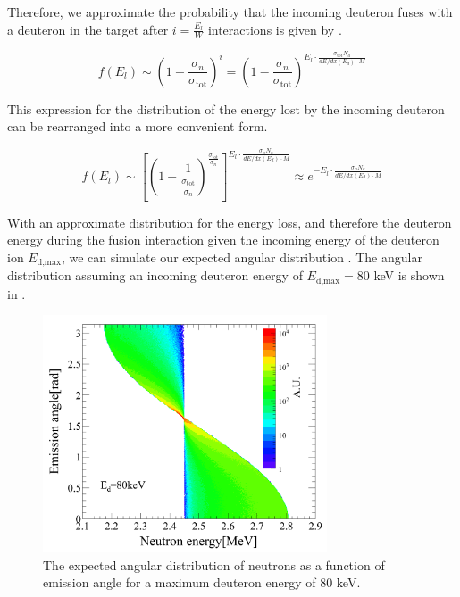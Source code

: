 Therefore, we approximate the probability that the incoming deuteron fuses with a deuteron in the target after $i = \frac{E_l}{W}$ interactions is given by .

\begin{equation}
        \label{eqn:nerix_minitron_energy_loss_1}
        f(E_l) \sim \left( 1 - \frac{\sigma_n}{\sigma_{\textrm{tot}}} \right)^i = \left( 1 - \frac{\sigma_n}{\sigma_{\textrm{tot}}} \right)^{E_l \cdot \frac{\sigma_{\textrm{tot}} N_a}{dE / dx(E_d) \cdot M}}
\end{equation}

This expression for the distribution of the energy lost by the incoming deuteron can be rearranged into a more convenient form.

\begin{equation}
        \label{eqn:nerix_minitron_energy_loss_2}
         f(E_l) \sim \left[ \left( 1 - \frac{1}{\frac{\sigma_{\textrm{tot}}}{\sigma_n}} \right)^{\frac{\sigma_{\textrm{tot}}}{\sigma_n}} \right] ^{E_l \cdot \frac{\sigma_n N_a}{dE / dx(E_d) \cdot M}} \approx e^{-E_l \cdot \frac{\sigma_n N_a}{dE / dx(E_d) \cdot M}}
\end{equation}

With an approximate distribution for the energy loss, and therefore the deuteron energy during the fusion interaction given the incoming energy of the deuteron ion $E_{\textrm{d,max}}$, we can simulate our expected angular distribution \cite{chadwick2011endf, guillaume_thesis}.  The angular distribution assuming an incoming deuteron energy of $E_{\textrm{d,max}} = 80$ keV is shown in .

\begin{figure}[t]
        \centering
	\includegraphics[width=0.75\textwidth]{nerix_yield_emission_angle}
	\caption{The expected angular distribution of neutrons as a function of emission angle for a maximum deuteron energy of 80 keV.}
	\label{fig:nerix_yield_emission_angle}
\end{figure}





